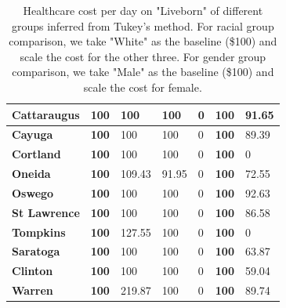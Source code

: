 \documentclass[10pt,twocolumn,letterpaper]{article}
\begin{document}
\begin{table}[htb!]
\begin{center}
\begin{tabular}{|l|l|l|l|l|l|l|}
\textbf{Cattaraugus} & \textbf{100} & 100 & 100 & 0 & \textbf{100} & 91.65 \\ \hline
\textbf{Cayuga} & \textbf{100} & 100 & 100 & 0 & \textbf{100} & 89.39 \\ \hline
\textbf{Cortland} & \textbf{100} & 100 & 100 & 0 & \textbf{100} & 0 \\ \hline
\textbf{Oneida} & \textbf{100} & 109.43 & 91.95 & 0 & \textbf{100} & 72.55 \\ \hline
\textbf{Oswego} & \textbf{100} & 100 & 100 & 0 & \textbf{100} & 92.63 \\ \hline
\textbf{St Lawrence} & \textbf{100} & 100 & 100 & 0 & \textbf{100} & 86.58 \\ \hline
\textbf{Tompkins} & \textbf{100} & 127.55 & 100 & 0 & \textbf{100} & 0 \\ \hline
\textbf{Saratoga} & \textbf{100} & 100 & 100 & 0 & \textbf{100} & 63.87 \\ \hline
\textbf{Clinton} & \textbf{100} & 100 & 100 & 0 & \textbf{100} & 59.04 \\ \hline
\textbf{Warren} & \textbf{100} & 219.87 & 100 & 0 & \textbf{100} & 89.74 \\ \hline
\end{tabular}
\end{center}
\caption{Healthcare cost per day on "Liveborn" of different groups inferred from Tukey's method. For racial group comparison, we take "White" as the baseline (\$100) and scale the cost for the other three. For gender group comparison, we take "Male" as the baseline (\$100) and scale the cost for female.}
\end{table}
\end{document}
